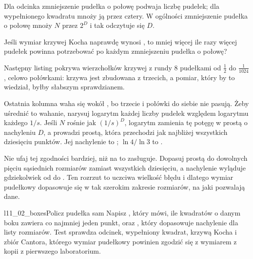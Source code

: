 
\noindent
Dla odcinka zmniejszenie pudełka o połowę podwaja liczbę pudełek; dla
wypełnionego kwadratu mnoży ją przez cztery. W ogólności zmniejszenie
pudełka o połowę mnoży $N$ przez $2^{D}$ i tak odczytuje się $D$.

\begin{think}
Jeśli wymiar krzywej Kocha naprawdę wynosi , to mniej
więcej ile razy więcej pudełek powinna potrzebować po każdym zmniejszeniu
pudełka o połowę?
\end{think}
Następny listing pokrywa  wierzchołków krzywej z
rundy $8$ pudełkami od $\tfrac{1}{2}$ do $\tfrac{1}{1024}$, celowo
połówkami: krzywa jest zbudowana z trzecich, a pomiar, który by to wiedział,
byłby słabszym sprawdzianem.



\noindent
Ostatnia kolumna waha się wokół , bo
trzecie i połówki do siebie nie pasują. Żeby uśrednić to wahanie, narysuj
logarytm każdej liczby pudełek względem logarytmu każdego $1/s$. Jeśli $N$
rośnie jak $(1/s)^{D}$, logarytm zamienia tę potęgę w prostą o nachyleniu
$D$, a  prowadzi prostą, która przechodzi jak najbliżej
wszystkich dziesięciu punktów. Jej nachylenie to ;
$\ln 4 / \ln 3$ to .

Nie ufaj tej zgodności bardziej, niż na to zasługuje. Dopasuj prostą do
dowolnych pięciu sąsiednich rozmiarów zamiast wszystkich dziesięciu, a
nachylenie wyląduje gdziekolwiek od  do
. Ten rozrzut to uczciwa wielkość błędu i dlatego wymiar
pudełkowy dopasowuje się w tak szerokim zakresie rozmiarów, na jaki pozwalają
dane.

\begin{lab}{l11_02_boxes}{Policz pudełka sam}
Napisz , który mówi, ile kwadratów o danym boku zawiera co
najmniej jeden punkt, oraz , który dopasowuje nachylenie
dla listy rozmiarów. Test sprawdza odcinek, wypełniony kwadrat, krzywą Kocha
i zbiór Cantora, którego wymiar pudełkowy powinien zgodzić się z wymiarem z
kopii z pierwszego laboratorium.
\end{lab}

